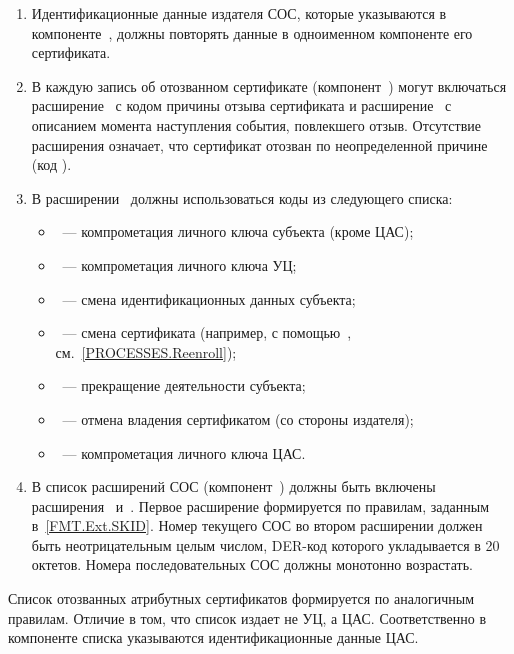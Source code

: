 \begin{enumerate}
\item
Идентификационные данные издателя СОС, которые указываются в 
компоненте~, должны повторять данные в одноименном 
компоненте его сертификата. 

\item
В каждую запись об отозванном сертификате (компонент~)
могут включаться расширение~ с кодом причины отзыва
сертификата и расширение~ с описанием момента наступления 
события, повлекшего отзыв.
%
Отсутствие расширения  означает, что сертификат отозван по 
неопределенной причине (код ).

\item
В расширении~ должны использоваться коды из следующего списка:
\begin{itemize}
\item
{}~--- компрометация личного ключа субъекта (кроме ЦАС); 
\item
{}~--- компрометация личного ключа УЦ;
\item
{}~--- смена идентификационных данных субъекта;
\item
{}~--- смена сертификата (например, с помощью~, 
см.~\ref{PROCESSES.Reenroll});
\item
{}~--- прекращение деятельности субъекта;
\item
{}~--- отмена владения сертификатом (со стороны 
издателя);
\item
{}~--- компрометация личного ключа ЦАС.
\end{itemize}


\item
В список расширений СОС (компонент~)
должны быть включены расширения~ 
и~. Первое расширение формируется по правилам,
заданным в~\ref{FMT.Ext.SKID}. Номер текущего СОС во втором расширении
должен быть неотрицательным целым числом, DER-код которого укладывается в 
20 октетов. Номера последовательных СОС должны монотонно возрастать.
\end{enumerate}

Список отозванных атрибутных сертификатов формируется по аналогичным правилам. 
Отличие в том, что список издает не УЦ, а ЦАС. Соответственно в компоненте 
 списка указываются идентификационные данные ЦАС.
